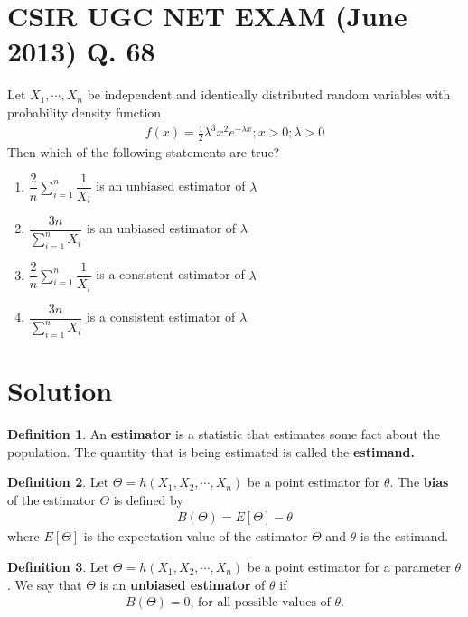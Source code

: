 \documentclass[journal,12pt,twocolumn]{IEEEtran}
\theoremstyle{definition}
\newtheorem{definition}{Definition}[section]
\begin{document}
\section*{CSIR UGC NET EXAM (June 2013) Q. 68}
Let $ X_1, \cdots , X_n $ be independent and identically distributed random variables with probability density function
\begin{align*}
    f(x) = \frac{1}{2} \lambda^3x^2e^{-\lambda x} ; x>0 ; \lambda > 0
\end{align*}
Then which of the following statements are true?
\begin{enumerate}
    \item $\dfrac{2}{n} \sum_{i=1}^{n} \dfrac{1}{X_i} $ is an unbiased estimator of $ \lambda$
    \item $\dfrac{3n}{\sum_{i=1}^{n} X_i } $ is an unbiased estimator of $ \lambda$ \\
    \item $\dfrac{2}{n} \sum_{i=1}^{n} \dfrac{1}{X_i} $ is a consistent estimator of $ \lambda$
    \item $\dfrac{3n}{\sum_{i=1}^{n} X_i } $ is a consistent estimator of $ \lambda$
\end{enumerate}

\section*{Solution}
\begin{definition}
An \textbf{estimator} is a statistic that estimates some fact about the population.
The quantity that is being estimated is called the \textbf{estimand.} 
\end{definition}
\begin{definition}
Let $ \Theta = h(X_1,X_2, \cdots, X_n) $  be a point estimator for $ \theta$. The \textbf{bias} of the estimator $ \Theta $ is defined by 
\begin{align}
    B(\Theta ) = E[\Theta ] - \theta
\end{align}
where $ E[\Theta ]$ is the expectation value of the estimator $ \Theta $ and $ \theta$ is the estimand.
\end{definition}

    \begin{definition}
    Let $\Theta = h(X_1,X_2, \cdots , X_n) $ be a point estimator for a parameter $ \theta $. We say that $ \Theta $ is an \textbf{unbiased estimator} of $ \theta $ if
    \begin{align}
       B(\Theta )= 0 \text{, for all possible values of $\theta$.}
    \end{align}
    \end{definition} 
\end{document}
